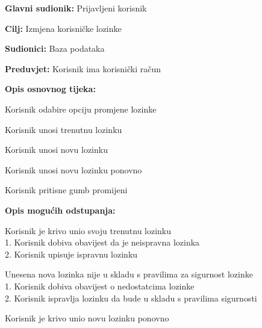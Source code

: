					\noindent {}
					\begin{packed_item}
						\item \textbf{Glavni sudionik:} Prijavljeni korisnik
						\item \textbf{Cilj:} Izmjena korisničke lozinke
						\item \textbf{Sudionici:} Baza podataka
						\item \textbf{Preduvjet:} Korisnik ima korisnički račun
						\item \textbf{Opis osnovnog tijeka:}
						\begin{packed_enum}
							\item Korisnik odabire opciju promjene lozinke
							\item Korisnik unosi trenutnu lozinku
							\item Korisnik unosi novu lozinku
							\item Korisnik unosi novu lozinku ponovno
							\item Korisnik pritisne gumb promijeni
						\end{packed_enum}
						\item \textbf{Opis mogućih odstupanja:}
						\begin{packed_item}
							\item [2.a] Korisnik je krivo unio svoju trenutnu lozinku
							\\1. Korisnik dobiva obavijest da je neispravna lozinka
							\\2. Korisnik upisuje ispravnu lozinku
							\item [3.a] Unesena nova lozinka nije u skladu s pravilima za sigurnost lozinke
							\\1. Korisnik dobiva obavijest o nedostatcima lozinke
							\\2. Korisnik ispravlja lozinku da bude u skladu s pravilima sigurnosti
							\item [4.a] Korisnik je krivo unio novu lozinku ponovno
						\end{packed_item}
					\end{packed_item}
					
